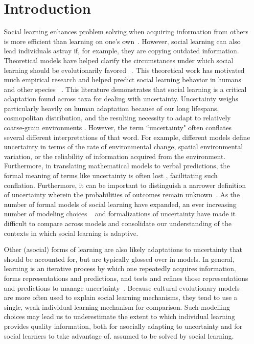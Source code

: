 \documentclass[letterpaper,11.5pt]{scrartcl}
\begin{document}
\section{Introduction}

Social learning enhances problem solving when acquiring information from others is more
efficient than learning on one's own~\cite{Laland2004}. However, social learning can also
lead individuals astray if, for example, they are copying outdated information.
Theoretical models have helped clarify the circumstances under which social learning
should be evolutionarily favored ~\cite{BoydRicherson1985}. This theoretical work has
motivated much empirical research and helped predict social learning behavior in humans
and other species ~\cite{McElreath2005,Kendal2018,Allen2019}.  This literature
demonstrates that social learning is a critical adaptation found across taxa for dealing
with uncertainty.  Uncertainty weighs particularly heavily on human adaptation because of
our long lifespans, cosmopolitan distribution, and the resulting necessity to adapt to
relatively coarse-grain environments \cite{levins1962}. However, the term ``uncertainty"
often conflates several different interpretations of that word. For example, different
models define uncertainty in terms of the rate of environmental change, spatial
environmental variation, or the reliability of information acquired from the environment.
Furthermore, in translating mathematical models to verbal predictions, the formal meaning
of terms like uncertainty is often lost \cite{lawson1988probability}, facilitating such
conflation. Furthermore, it can be important to distinguish a narrower definition of
uncertainty wherein the probabilities of outcomes remain unknown~\cite{knight1921,
volz2012}. As the number of formal models of social learning have expanded, an ever
increasing number of modeling choices ~\cite[Figure 1]{Kendal2018} and formalizations of
uncertainty have made it difficult to compare across models and consolidate our
understanding of the contexts in which social learning is adaptive. 

Other (asocial) forms of learning are also likely adaptations to uncertainty that should be
accounted for, but are typically glossed over in models.  In general, learning is an iterative
process by which one repeatedly acquires information, forms representations and
predictions, and tests and refines those representations and predictions to manage
uncertainty~\cite{jacobs2011bayesian,clark2013whatever}.  Because cultural evolutionary
models are more often used to explain social learning mechanisms, they tend to use a
single, weak individual-learning mechanism for comparison. Such modelling choices may lead us to underestimate the extent to which individual learning provides
quality information, both for asocially adapting to uncertainty and for social learners to take advantage of.
assumed to be solved by social learning. 
\end{document}
